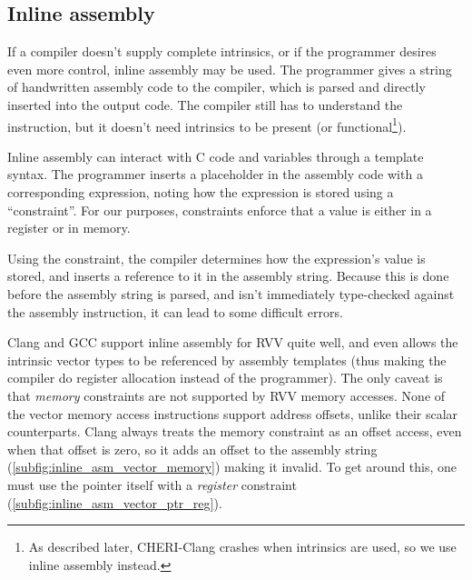\documentclass[../thesis]{subfiles}
\begin{document}
\subsection{Inline assembly}
If a compiler doesn't supply complete intrinsics, or if the programmer desires even more control, inline assembly may be used.
The programmer gives a string of handwritten assembly code to the compiler, which is parsed and directly inserted into the output code.
The compiler still has to understand the instruction, but it doesn't need intrinsics to be present (or functional\footnote{As described later, CHERI-Clang crashes when intrinsics are used, so we use inline assembly instead.}).

Inline assembly can interact with C code and variables through a template syntax.
The programmer inserts a placeholder in the assembly code with a corresponding expression, noting how the expression is stored using a \enquote{constraint}.
For our purposes, constraints enforce that a value is either in a register or in memory.

Using the constraint, the compiler determines how the expression's value is stored, and inserts a reference to it in the assembly string.
Because this is done before the assembly string is parsed, and isn't immediately type-checked against the assembly instruction, it can lead to some difficult errors.

Clang and GCC support inline assembly for RVV quite well, and even allows the intrinsic vector types to be referenced by assembly templates (thus making the compiler do register allocation instead of the programmer).
The only caveat is that \emph{memory} constraints are not supported by RVV memory accesses.
None of the vector memory access instructions support address offsets, unlike their scalar counterparts.
Clang always treats the memory constraint as an offset access, even when that offset is zero, so it adds an offset to the assembly string (\cref{subfig:inline_asm_vector_memory}) making it invalid.
To get around this, one must use the pointer itself with a \emph{register} constraint (\cref{subfig:inline_asm_vector_ptr_reg}).
\end{document}
